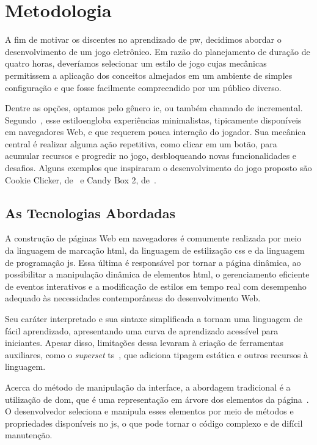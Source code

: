 \section{Metodologia}%
\label{sec:metodologia}

A fim de motivar os discentes no aprendizado de \gls{pw}, decidimos abordar o desenvolvimento de um jogo eletrônico.
Em razão do planejamento de duração de quatro horas, deveríamos selecionar um estilo de jogo cujas mecânicas permitissem a aplicação dos conceitos almejados em um ambiente de simples configuração e que fosse facilmente compreendido por um público diverso.

Dentre as opções, optamos pelo gênero \gls{ic}, ou também chamado de incremental.
Segundo~, esse estiloengloba experiências minimalistas, tipicamente disponíveis em navegadores Web, e que requerem pouca interação do jogador.
Sua mecânica central é realizar alguma ação repetitiva, como clicar em um botão, para acumular recursos e progredir no jogo, desbloqueando novas funcionalidades e desafios.
Alguns exemplos que inspiraram o desenvolvimento do jogo proposto são Cookie Clicker, de~ e Candy Box 2, de~.

\subsection{As Tecnologias Abordadas}

A construção de páginas Web em navegadores é comumente realizada por meio da linguagem de marcação \gls{html}, da linguagem de estilização \gls{css} e da linguagem de programação \gls{js}.
Essa última é responsável por tornar a página dinâmica, ao possibilitar a manipulação dinâmica de elementos \gls{html}, o gerenciamento eficiente de eventos interativos e a modificação de estilos em tempo real com desempenho adequado às necessidades contemporâneas do desenvolvimento Web.

Seu caráter interpretado e sua sintaxe simplificada a tornam uma linguagem de fácil aprendizado, apresentando uma curva de aprendizado acessível para iniciantes.
Apesar disso, limitações dessa levaram à criação de ferramentas auxiliares, como o \textit{superset} \gls{ts}~\cite{microsoft:2012:typescript}, que adiciona tipagem estática e outros recursos à linguagem.

Acerca do método de manipulação da interface, a abordagem tradicional é a utilização de \gls{dom}, que é uma representação em árvore dos elementos da página~\cite{whatwg:2025:dom_standard}.
O desenvolvedor seleciona e manipula esses elementos por meio de métodos e propriedades disponíveis no \gls{js}, o que pode tornar o código complexo e de difícil manutenção.


